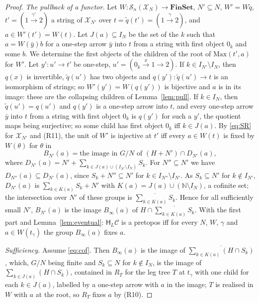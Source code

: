 \documentclass[11pt]{amsart}
\theoremstyle{definition}
\newcommand{\Fin}{\mathbf{FinSet}}
\newcommand{\Max}{\mathrm{Max}}
\newcommand{\HH}{\mathsf H}
\newcommand{\cX}{\mathcal X}
\newcommand{\cC}{\mathcal C}
\newcommand{\cS}{\mathcal S}
\begin{document}
\begin{proof}
\emph{The pullback of a functor.} Let $W\colon\cS_n(\cX_N)\to\Fin$,
$N'\subseteq N$, $W'=W\tilde q$, $t'=(1\xrightarrow{\gamma'}2)$ a
string of $\cX_{N'}$ over $t=\tilde q(t')=(1\xrightarrow{\gamma}2)$,
and $a\in W'(t')=W(t)$. Let $J(a)\subseteq I_N$ be the set of the $k$
such that $a=W(\bar y)b$ for a one-step arrow $\bar y$ into $t$ from a
string with first object $0_k$ and some $b$. We determine the first
objects of the children of the root of $\Max(t',a)$ for $W'$. Let
$y'\colon u'\to t'$ be one-step, $u'=(0_k\xrightarrow{x}1\to2)$. If
$k\in I_{N'}\setminus I_N$, then $q(x)$ is invertible, $\tilde q(u')$
has two objects and $q(y')\colon\tilde q(u')\to t$ is an isomorphism
of strings; so $W'(y')=W(q(y'))$ is bijective and $a$ is in its image:
these are the collapsing children of Lemma~\ref{lem:pull}. If $k\in
I_N$, then $\tilde q(u')=q(u')$ and $q(y')$ is a one-step arrow into
$t$, and every one-step arrow $\bar y$ into $t$ from a string with
first object $0_k$ is $q(y')$ for such a $y'$, the quotient maps being
surjective; so some child has first object $0_k$ iff $k\in J(a)$. By
\eqref{eq:SR} for $\cX_{N'}$ and (R11), the unit of $W'$ is injective
at $t'$ iff every $a\in W(t)$ is fixed by $W(\theta)$ for $\theta$ in
\[
B_{N'}(a)=\text{the image in }G/N\text{ of }(H+N')\cap D_{N'}(a),
\]
where $D_{N'}(a)=N'+\sum_{k\in J(a)\cup(I_{N'}\setminus I_N)}S_k$.
For $N''\subseteq N'$ we have $D_{N''}(a)\subseteq D_{N'}(a)$, since
$S_k+N''\subseteq N'$ for $k\in I_{N''}\setminus I_{N'}$. As
$S_k\subseteq N'$ for $k\notin I_{N'}$, $D_{N'}(a)$ is $\sum_{k\in
K(a)}S_k+N'$ with $K(a)=J(a)\cup(\mathbb N\setminus I_N)$, a cofinite
set; the intersection over $N'$ of these groups is
$\overline{\sum_{k\in K(a)}S_k}$. Hence for all sufficiently small
$N'$, $B_{N'}(a)$ is the image $B_\infty(a)$ of $H\cap\overline{
\sum_{k\in K(a)}S_k}$. With the first part and
Lemma~\ref{lem:eventual}: $\HH_L\cC$ is a pretopos iff for every $N$,
$W$, $\gamma$ and $a\in W(t_\gamma)$ the group $B_\infty(a)$ fixes
$a$.

\emph{Sufficiency.} Assume \eqref{eq:cof}. Then $B_\infty(a)$ is the
image of $\overline{\sum_{k\in K(a)}(H\cap S_k)}$, which, $G/N$ being
finite and $S_k\subseteq N$ for $k\notin I_N$, is the image of
$\sum_{k\in J(a)}(H\cap S_k)$, contained in $R_T$ for the leg tree $T$
at $t_\gamma$ with one child for each $k\in J(a)$, labelled by a
one-step arrow with $a$ in the image; $T$ is realised in $W$ with $a$
at the root, so $R_T$ fixes $a$ by (R10).


\end{proof}
\end{document}
